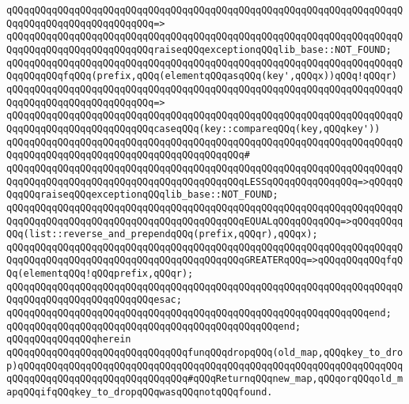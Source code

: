 \verb|qQQqqQQqqQQqqQQqqQQqqQQqqQQqqQQqqQQqqQQqqQQqqQQqqQQqqQQqqQQqqQQqqQQqqQQqqQQqqQQqqQQqqQQqqQQqqQQq=>|\newline
\verb|qQQqqQQqqQQqqQQqqQQqqQQqqQQqqQQqqQQqqQQqqQQqqQQqqQQqqQQqqQQqqQQqqQQqqQQqqQQqqQQqqQQqqQQqqQQqqQQqraiseqQQqexceptionqQQqlib_base::NOT_FOUND;|\newline
\newline
\verb|qQQqqQQqqQQqqQQqqQQqqQQqqQQqqQQqqQQqqQQqqQQqqQQqqQQqqQQqqQQqqQQqqQQqqQQqqQQqqQQqfqQQq(prefix,qQQq(elementqQQqasqQQq(key',qQQqx))qQQq!qQQqr)|\newline
\verb|qQQqqQQqqQQqqQQqqQQqqQQqqQQqqQQqqQQqqQQqqQQqqQQqqQQqqQQqqQQqqQQqqQQqqQQqqQQqqQQqqQQqqQQqqQQqqQQq=>|\newline
\verb|qQQqqQQqqQQqqQQqqQQqqQQqqQQqqQQqqQQqqQQqqQQqqQQqqQQqqQQqqQQqqQQqqQQqqQQqqQQqqQQqqQQqqQQqqQQqqQQqcaseqQQq(key::compareqQQq(key,qQQqkey'))|\newline
\verb|qQQqqQQqqQQqqQQqqQQqqQQqqQQqqQQqqQQqqQQqqQQqqQQqqQQqqQQqqQQqqQQqqQQqqQQqqQQqqQQqqQQqqQQqqQQqqQQqqQQqqQQqqQQqqQQq#|\newline
\verb|qQQqqQQqqQQqqQQqqQQqqQQqqQQqqQQqqQQqqQQqqQQqqQQqqQQqqQQqqQQqqQQqqQQqqQQqqQQqqQQqqQQqqQQqqQQqqQQqqQQqqQQqqQQqqQQqLESSqQQqqQQqqQQqqQQq=>qQQqqQQqqQQqraiseqQQqexceptionqQQqlib_base::NOT_FOUND;|\newline
\verb|qQQqqQQqqQQqqQQqqQQqqQQqqQQqqQQqqQQqqQQqqQQqqQQqqQQqqQQqqQQqqQQqqQQqqQQqqQQqqQQqqQQqqQQqqQQqqQQqqQQqqQQqqQQqqQQqEQUALqQQqqQQqqQQq=>qQQqqQQqqQQq(list::reverse_and_prependqQQq(prefix,qQQqr),qQQqx);|\newline
\verb|qQQqqQQqqQQqqQQqqQQqqQQqqQQqqQQqqQQqqQQqqQQqqQQqqQQqqQQqqQQqqQQqqQQqqQQqqQQqqQQqqQQqqQQqqQQqqQQqqQQqqQQqqQQqqQQqGREATERqQQq=>qQQqqQQqqQQqfqQQq(elementqQQq!qQQqprefix,qQQqr);|\newline
\verb|qQQqqQQqqQQqqQQqqQQqqQQqqQQqqQQqqQQqqQQqqQQqqQQqqQQqqQQqqQQqqQQqqQQqqQQqqQQqqQQqqQQqqQQqqQQqqQQqesac;|\newline
\verb|qQQqqQQqqQQqqQQqqQQqqQQqqQQqqQQqqQQqqQQqqQQqqQQqqQQqqQQqqQQqqQQqend;|\newline
\verb|qQQqqQQqqQQqqQQqqQQqqQQqqQQqqQQqqQQqqQQqqQQqqQQqend;|\newline
\verb|qQQqqQQqqQQqqQQqherein|\newline
\verb|qQQqqQQqqQQqqQQqqQQqqQQqqQQqqQQqfunqQQqdropqQQq(old_map,qQQqkey_to_drop)qQQqqQQqqQQqqQQqqQQqqQQqqQQqqQQqqQQqqQQqqQQqqQQqqQQqqQQqqQQqqQQqqQQqqQQqqQQqqQQqqQQqqQQqqQQqqQQqqQQq#qQQqReturnqQQqnew_map,qQQqorqQQqold_mapqQQqifqQQqkey_to_dropqQQqwasqQQqnotqQQqfound.|\newline

